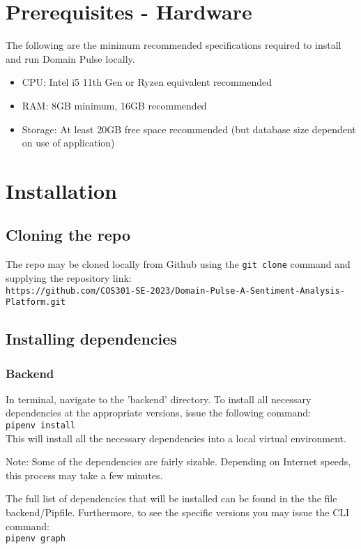\documentclass[12pt]{article}
\begin{document}
\section{Prerequisites - Hardware}
The following are the minimum recommended specifications required to install and run Domain Pulse locally.
\begin{itemize}
    \item CPU: Intel i5 11th Gen or Ryzen equivalent recommended
    \item RAM: 8GB minimum, 16GB recommended
    \item Storage: At least 20GB free space recommended (but database size dependent on use of application)
\end{itemize}


\section{Installation}

\subsection{Cloning the repo}
The repo may be cloned locally from Github using the \texttt{git clone} command and supplying the repository link:\\
\texttt{https://github.com/COS301-SE-2023/Domain-Pulse-A-Sentiment-Analysis-Platform.git}



\subsection{Installing dependencies}
\subsubsection{Backend}
In terminal, navigate to the 'backend' directory. To install all necessary dependencies at the appropriate versions, issue the following
command: \\
\texttt{pipenv install}\\
This will install all the necessary dependencies into a local virtual environment.

Note: Some of the dependencies are fairly sizable. Depending on Internet speeds, this process may take a few minutes.

The full list of dependencies that will be installed can be found in the the file backend/Pipfile. Furthermore, to see the specific versions you may issue the CLI command:\\
\texttt{pipenv graph}
\end{document}
